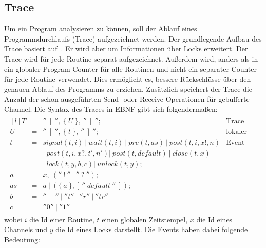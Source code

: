 \subsection{Trace}\label{chap:background-sec:trace}
Um ein Program analysieren zu können, soll der Ablauf eines Programmdurchlaufs
(Trace) aufgezeichnet werden. Der grundlegende Aufbau des Trace basiert auf~\cite{PPDP18}. 
Er wird aber um Informationen 
über Locks erweitert. Der Trace wird für jede Routine
separat aufgezeichnet. Außerdem wird, anders als in~\cite{PPDP18} ein globaler
Program-Counter für alle Routinen und nicht ein separater Counter für jede 
Routine verwendet. Dies ermöglicht es, bessere Rückschlüsse über den genauen 
Ablauf des Programms zu erziehen. Zusätzlich speichert der Trace die Anzahl 
der schon ausgeführten Send- oder Receive-Operationen für gebufferte Channel.
Die Syntax des Traces in EBNF gibt sich 
folgendermaßen:
\begin{align*}
  \begin{matrix*}[l]
    T & = & ''\ [\ '',\ \{\ U\ \},\ ''\ ]\ ''; & \text{Trace}\\
    U & = & ''\ [\ '',\ \{\ t\ \},\ ''\ ]\ ''; & \text{lokaler Trace} \\
    t & = & signal(t, i)\ |\ wait(t, i)\ |\ pre(t, as)\ |\ post(t, i, x!, n) & \text{Event}\\
      &   & |\ post(t, i, x?, t', n') |\ post(t, default)\ 
      |\ close(t, x)\  
      & \\
      &   & |\ lock(t, y, b, c) |\ unlock(t, y); & \\
    a & = & x,\ (''\ !\ ''\ |\ ''\ ?\ ''); & \\
    as & = & a\ |\ (\{\ a\ \}, [\ ''\ default\ ''\ ]); & \\
    b & = & ''-''\ |\ ''t''\ |\ ''r''\ |\ ''tr'' & \\
    c & = & ''0''\ |\ ''1''
  \end{matrix*}
\end{align*}
wobei $i$ die Id einer Routine, $t$ einen globalen Zeitstempel, $x$ die Id eines 
Channels und $y$ die Id eines Locks darstellt. Die Events haben dabei folgende Bedeutung:
